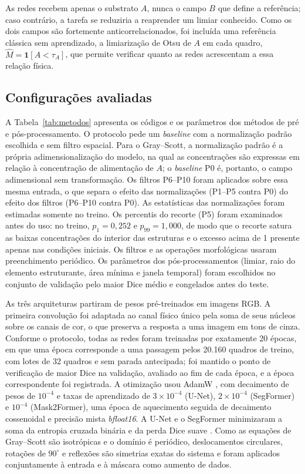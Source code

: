 \documentclass[12pt]{article}
\newcommand{\ind}{\mathbf{1}}
\begin{document}
As redes recebem apenas o substrato $A$, nunca o campo $B$ que define a referência; caso contrário, a tarefa se reduziria a reaprender um limiar conhecido. Como os dois campos são fortemente anticorrelacionados, foi incluída uma referência clássica sem aprendizado, a limiarização de Otsu de $A$ em cada quadro, $\hat M=\ind[A<\tau_A]$, que permite verificar quanto as redes acrescentam a essa relação física.

\subsection{Configurações avaliadas}
\label{subsec:configuracoes}

A Tabela~\ref{tab:metodos} apresenta os códigos e os parâmetros dos métodos de pré e pós-processamento. O protocolo pede um \textit{baseline} com a normalização padrão escolhida e sem filtro espacial. Para o Gray--Scott, a normalização padrão é a própria adimensionalização do modelo, na qual as concentrações são expressas em relação à concentração de alimentação de $A$; o \textit{baseline} P0 é, portanto, o campo adimensional sem transformação. Os filtros P6--P10 foram aplicados sobre essa mesma entrada, o que separa o efeito das normalizações (P1--P5 contra P0) do efeito dos filtros (P6--P10 contra P0). As estatísticas das normalizações foram estimadas somente no treino. Os percentis do recorte (P5) foram examinados antes do uso: no treino, $p_1=0{,}252$ e $p_{99}=1{,}000$, de modo que o recorte satura as baixas concentrações do interior das estruturas e o excesso acima de 1 presente apenas nas condições iniciais. Os filtros e as operações morfológicas usaram preenchimento periódico. Os parâmetros dos pós-processamentos (limiar, raio do elemento estruturante, área mínima e janela temporal) foram escolhidos no conjunto de validação pelo maior Dice médio e congelados antes do teste.



As três arquiteturas partiram de pesos pré-treinados em imagens RGB. A primeira convolução foi adaptada ao canal físico único pela soma de seus núcleos sobre os canais de cor, o que preserva a resposta a uma imagem em tons de cinza. Conforme o protocolo, todas as redes foram treinadas por exatamente 20 épocas, em que uma época corresponde a uma passagem pelos 20.160 quadros de treino, com lotes de 32 quadros e sem parada antecipada; foi mantido o ponto de verificação de maior Dice na validação, avaliado ao fim de cada época, e a época correspondente foi registrada. A otimização usou AdamW \cite{loshchilov2019adamw}, com decaimento de pesos de $10^{-4}$ e taxas de aprendizado de $3\times10^{-4}$ (U-Net), $2\times10^{-4}$ (SegFormer) e $10^{-4}$ (Mask2Former), uma época de aquecimento seguida de decaimento cossenoidal \cite{loshchilov2017sgdr} e precisão mista \textit{bfloat16}. A U-Net e o SegFormer minimizaram a soma da entropia cruzada binária e da perda Dice suave \cite{milletari2016vnet}. Como as equações de Gray--Scott são isotrópicas e o domínio é periódico, deslocamentos circulares, rotações de $90^\circ$ e reflexões são simetrias exatas do sistema e foram aplicados conjuntamente à entrada e à máscara como aumento de dados.
\end{document}
